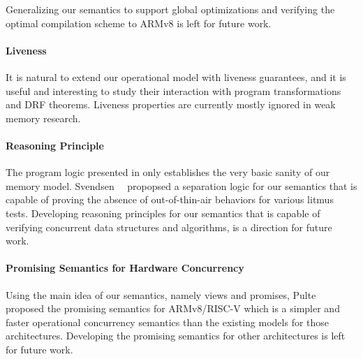 Generalizing our semantics to support global optimizations and verifying the optimal compilation
scheme to ARMv8 is left for future work.




\paragraph{Liveness}

It is natural to extend our operational model with liveness guarantees,
and it is useful and interesting to study their interaction with
 program transformations and DRF theorems.
Liveness properties are currently mostly ignored in weak memory research.




\paragraph{Reasoning Principle}

The program logic presented in  only establishes the very basic sanity of our
memory model.  Svendsen~\etal{}~\cite{promising-logic} propopsed a separation logic for our
semantics that is capable of proving the absence of out-of-thin-air behaviors for various litmus
tests.  Developing reasoning principles for our semantics that is capable of verifying concurrent
data structures and algorithms, is a direction for future work.


\paragraph{Promising Semantics for Hardware Concurrency}

Using the main idea of our semantics, namely views and promises,
Pulte~\etal{}~\cite{promising-armv8-riscv} proposed the promising semantics for ARMv8/RISC-V which
is a simpler and faster operational concurrency semantics than the existing models for those
architectures.  Developing the promising semantics for other architectures is left for future work.


